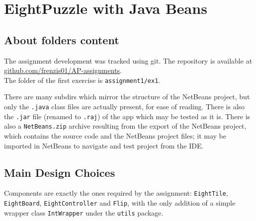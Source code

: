 \chapter{EightPuzzle with Java Beans}

\section{About folders content}

The assignment development was tracked using git. The repository is available at \href{https://github.com/frenzis01/AP-assignments}{github.com/frenzis01/AP-assignments}.\\
The folder of the first exercise is \texttt{assignment1/ex1}.
 
There are many subdirs which mirror the structure of the NetBeans project, but only the \texttt{.java} class files are actually present, for ease of reading.
There is also the \texttt{.jar} file (renamed to \texttt{.raj}) of the app which may be tested as it is.
There is also a \texttt{NetBeans.zip} archive resulting from the export of the NetBeans project, which contains the source code and the NetBeans project files; it may be imported in NetBeans to navigate and test project from the IDE.


\section{Main Design Choices}

Components are exactly the ones required by the assignment: \lstinline|EightTile|, \lstinline|EightBoard|, \lstinline|EightController| and \lstinline|Flip|, with the only addition of a simple wrapper class \lstinline|IntWrapper| under the \lstinline|utils| package.

